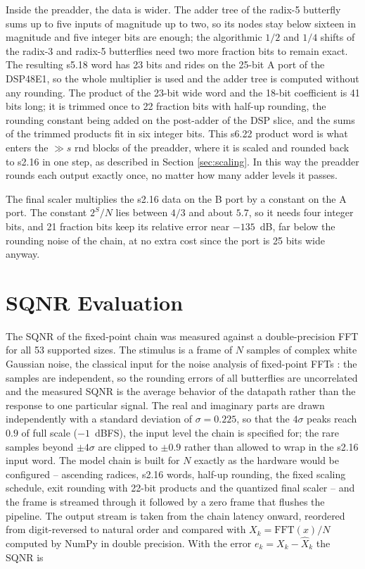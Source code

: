 \documentclass[a4paper,12pt, master]{etf}
\begin{document}
Inside the preadder, the data is wider. The adder tree of the radix-5 butterfly sums up to five inputs of magnitude up to two, so its nodes stay below sixteen in magnitude and five integer bits are enough; the algorithmic $1/2$ and $1/4$ shifts of the radix-3 and radix-5 butterflies need two more fraction bits to remain exact. The resulting s5.18 word has 23 bits and rides on the 25-bit A port of the DSP48E1, so the whole multiplier is used and the adder tree is computed without any rounding. The product of the 23-bit wide word and the 18-bit coefficient is 41 bits long; it is trimmed once to 22 fraction bits with half-up rounding, the rounding constant being added on the post-adder of the DSP slice, and the sums of the trimmed products fit in six integer bits. This s6.22 product word is what enters the $\gg s$ rnd blocks of the preadder, where it is scaled and rounded back to s2.16 in one step, as described in Section \ref{sec:scaling}. In this way the preadder rounds each output exactly once, no matter how many adder levels it passes.

The final scaler multiplies the s2.16 data on the B port by a constant on the A port. The constant $2^{S}/N$ lies between $4/3$ and about $5.7$, so it needs four integer bits, and 21 fraction bits keep its relative error near $-135$~dB, far below the rounding noise of the chain, at no extra cost since the port is 25 bits wide anyway.

\section{SQNR Evaluation}
\label{sec:sqnr}

The SQNR of the fixed-point chain was measured against a double-precision FFT for all 53 supported sizes. The stimulus is a frame of $N$ samples of complex white Gaussian noise, the classical input for the noise analysis of fixed-point FFTs \cite{oppenheim_weinstein}: the samples are independent, so the rounding errors of all butterflies are uncorrelated and the measured SQNR is the average behavior of the datapath rather than the response to one particular signal. The real and imaginary parts are drawn independently with a standard deviation of $\sigma = 0.225$, so that the $4\sigma$ peaks reach $0.9$ of full scale ($-1$~dBFS), the input level the chain is specified for; the rare samples beyond $\pm 4\sigma$ are clipped to $\pm 0.9$ rather than allowed to wrap in the s2.16 input word. The model chain is built for $N$ exactly as the hardware would be configured -- ascending radices, s2.16 words, half-up rounding, the fixed scaling schedule, exit rounding with 22-bit products and the quantized final scaler -- and the frame is streamed through it followed by a zero frame that flushes the pipeline. The output stream is taken from the chain latency onward, reordered from digit-reversed to natural order and compared with $X_k = \mathrm{FFT}(x)/N$ computed by NumPy in double precision. With the error $e_k = X_k - \hat{X}_k$ the SQNR is
\end{document}

